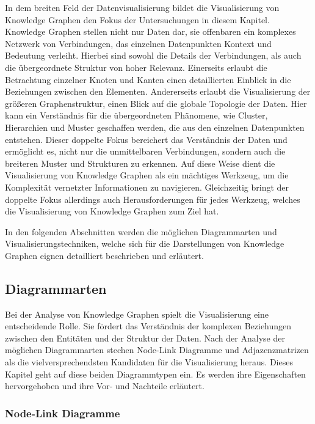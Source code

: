 In dem breiten Feld der Datenvisualisierung bildet die Visualisierung von Knowledge Graphen den Fokus der Untersuchungen in diesem Kapitel. Knowledge Graphen stellen nicht nur Daten dar, sie offenbaren ein komplexes Netzwerk von Verbindungen, das einzelnen Datenpunkten Kontext und Bedeutung verleiht. Hierbei sind sowohl die Details der Verbindungen, als auch die übergeordnete Struktur von hoher Relevanz. Einerseits erlaubt die Betrachtung einzelner Knoten und Kanten einen detaillierten Einblick in die Beziehungen zwischen den Elementen. Andererseits erlaubt die Visualisierung der größeren Graphenstruktur, einen Blick auf die globale Topologie der Daten. Hier kann ein Verständnis für die übergeordneten Phänomene, wie Cluster, Hierarchien und Muster geschaffen werden, die aus den einzelnen Datenpunkten entstehen. Dieser doppelte Fokus bereichert das Verständnis der Daten und ermöglicht es, nicht nur die unmittelbaren Verbindungen, sondern auch die breiteren Muster und Strukturen zu erkennen. Auf diese Weise dient die Visualisierung von Knowledge Graphen als ein mächtiges Werkzeug, um die Komplexität vernetzter Informationen zu navigieren. Gleichzeitig bringt der doppelte Fokus allerdings auch Herausforderungen für jedes Werkzeug, welches die Visualisierung von Knowledge Graphen zum Ziel hat.

In den folgenden Abschnitten werden die möglichen Diagrammarten und Visualisierungstechniken, welche sich für die Darstellungen von Knowledge Graphen eignen detailliert beschrieben und erläutert.

\subsection{Diagrammarten}
\label{theory:visualization:types}

Bei der Analyse von Knowledge Graphen spielt die Visualisierung eine entscheidende Rolle. Sie fördert das Verständnis der komplexen Beziehungen zwischen den Entitäten und der Struktur der Daten. Nach der Analyse der möglichen Diagrammarten stechen Node-Link Diagramme und Adjazenzmatrizen als die vielversprechendsten Kandidaten für die Visualisierung heraus. Dieses Kapitel geht auf diese beiden  Diagrammtypen ein. Es werden ihre Eigenschaften hervorgehoben und ihre Vor- und Nachteile erläutert.

\subsubsection{Node-Link Diagramme}


